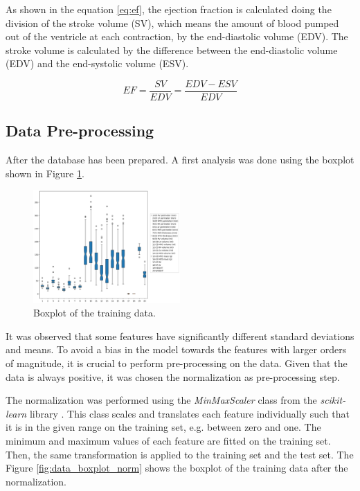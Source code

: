 \documentclass[conference]{IEEEtran}
\begin{document}
        As shown in the equation \ref{eq:ef}, the ejection fraction is calculated doing the division of the stroke volume
        (SV), which means the amount of blood pumped out of the ventricle at each contraction, by the end-diastolic volume
        (EDV). The stroke volume is calculated by the difference between the end-diastolic volume (EDV) and the
        end-systolic volume (ESV). 
        
        \begin{equation}
            EF = \frac{SV}{EDV} = \frac{EDV - ESV}{EDV}
            \label{eq:ef}
        \end{equation}


\subsection{Data Pre-processing}

    After the database has been prepared. A first analysis was done using the boxplot shown in
    Figure \ref{fig:data_boxplot}.

    \begin{figure}
        \centering
        \includegraphics[width=0.5\textwidth]{images/boxplot_data.png}
        \caption{Boxplot of the training data.}
        \label{fig:data_boxplot}
    \end{figure}

    It was observed that some features have significantly different standard deviations and means.
    To avoid a bias in the model towards the features with larger orders of magnitude, it is crucial to perform 
    pre-processing on the data. Given that the data is always positive, it was chosen the normalization as pre-processing 
    step.

    The normalization was performed using the \textit{MinMaxScaler} class from the \textit{scikit-learn} library \cite{scikit-learn}.
    This class scales and translates each feature individually such that it is in the given range on the training set, 
    e.g. between zero and one. The minimum and maximum values of each feature are fitted on the training set. Then, the
    same transformation is applied to the training set and the test set. The Figure \ref{fig:data_boxplot_norm} shows the
    boxplot of the training data after the normalization.
    
\end{document}

